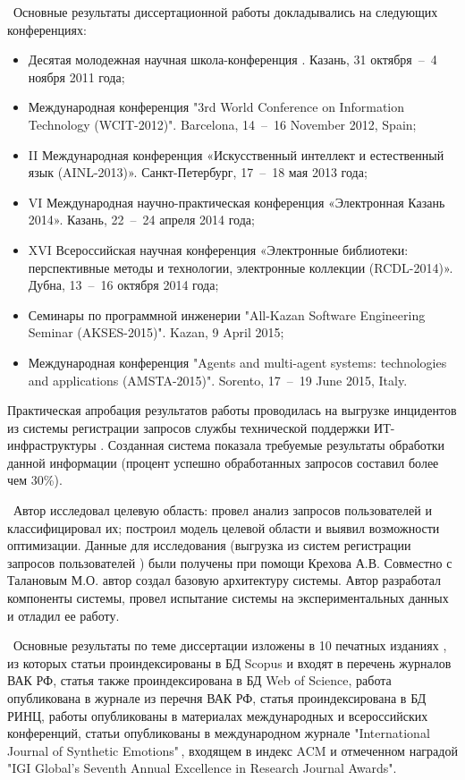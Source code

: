 \probation\
 Основные результаты диссертационной работы докладывались на следующих конференциях:
\begin{itemize}
	\item Десятая молодежная научная школа-конференция . Казань, 31 октября~--~4 ноября 2011 года;
	\item Международная конференция "3rd World Conference on Information Technology (WCIT-2012)". Barcelona, 14~--~16 November 2012, Spain; 
	\item II Международная конференция «Искусственный интеллект и естественный язык (AINL-2013)». Санкт-Петербург, 17~--~18 мая 2013 года;
	\item VI Международная научно-практическая конференция «Электронная Казань 2014». Казань, 22~--~24 апреля 2014 года;
	\item XVI Всероссийская научная конференция «Электронные библиотеки: перспективные методы и технологии, электронные коллекции (RCDL-2014)». Дубна, 13~--~16 октября 2014 года;
	\item Семинары по программной инженерии "All-Kazan Software Engineering Seminar (AKSES-2015)". Kazan, 9 April 2015;
	\item Международная конференция "Agents and multi-agent systems: technologies and applications (AMSTA-2015)". Sorento, 17~--~19 June 2015, Italy.
\end{itemize} \par
Практическая апробация результатов работы проводилась на выгрузке инцидентов из системы регистрации запросов службы технической поддержки ИТ-инфраструктуры \icl. Созданная система показала требуемые результаты обработки данной информации (процент успешно обработанных запросов составил более чем 30\%). \par
\contribution\ Автор исследовал целевую область: провел анализ запросов пользователей и классифицировал их; построил модель целевой области и выявил возможности оптимизации. Данные для исследования (выгрузка из систем регистрации запросов пользователей \iclshort) были получены при помощи Крехова А.В.  Совместно с Талановым М.О. автор создал базовую архитектуру системы. Автор разработал компоненты системы, провел испытание системы на экспериментальных данных и отладил ее работу. \par
\publications\ Основные результаты по теме диссертации изложены в 10 печатных изданиях  \cite{Lobachevskii, WCIT-2012,  ISGZ, IJSE-1, IJSE-2, RCDL-2014, AMSTA-2015, VAK-1, EB-1, EB-2}, из которых статьи \cite{RCDL-2014, AMSTA-2015} проиндексированы в БД Scopus и входят в перечень журналов ВАК РФ, статья \cite{AMSTA-2015} также проиндексирована в БД Web of Science, работа \cite{VAK-1} опубликована в журнале из перечня ВАК РФ, статья \cite{ISGZ} проиндексирована в БД РИНЦ, работы \cite{Lobachevskii, WCIT-2012, ISGZ} опубликованы в материалах международных и всероссийских конференций, статьи \cite{IJSE-1, IJSE-2} опубликованы в международном журнале "International Journal of Synthetic Emotions"\,, входящем в индекс ACM и отмеченном наградой "IGI Global’s Seventh Annual Excellence in Research Journal Awards". \par
